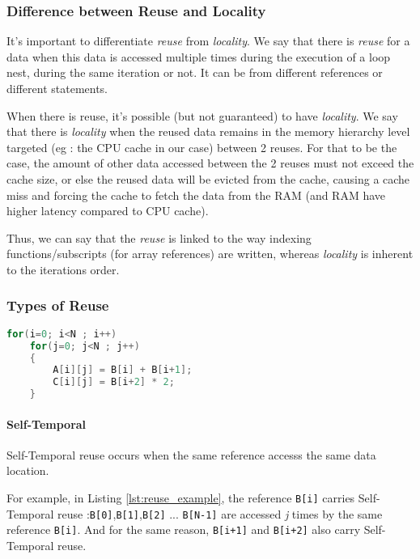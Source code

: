 \documentclass[paper=a4, fontsize=11.5pt]{scrartcl}
\numberwithin{equation}{section}        %
\numberwithin{figure}{section}          %
\numberwithin{table}{section}               %
\begin{document}
        \subsubsection{Difference between Reuse and Locality}
            It's important to differentiate \textit{reuse} from \textit{locality}.
            We say that there is \textit{reuse} for a data when this data is
            accessed multiple times during the execution of a loop nest, during
            the same iteration or not. It can be from different references or different statements.
            
            When there is reuse, it's possible (but not guaranteed) to have
            \textit{locality}. We say that there is \textit{locality} when the
            reused data remains in the memory hierarchy level targeted 
            (eg : the CPU cache in our case) between 2 reuses.
            For that to be the case, the amount of other data accessed between the
            2 reuses must not exceed the cache size, or else the reused data will be
            evicted from the cache, causing a cache miss and forcing the cache
            to fetch the data from the RAM (and RAM have higher latency compared to CPU cache).


            Thus, we can say that the \textit{reuse} is linked to the way indexing
            functions/subscripts (for array references) are written, whereas \textit{locality} is
            inherent to the iterations order.

\pagebreak
        \subsubsection{Types of Reuse}
            
\begin{lstlisting}[frame=single, language=C, caption=Reuse Example, label={lst:reuse_example}]
for(i=0; i<N ; i++)
    for(j=0; j<N ; j++)
    {
        A[i][j] = B[i] + B[i+1];
        C[i][j] = B[i+2] * 2;
    }
\end{lstlisting}

            \paragraph{Self-Temporal}
                Self-Temporal reuse occurs when the same reference accesss the same
                data location.
                
                For example, in Listing \ref{lst:reuse_example}, the reference \verb'B[i]' carries Self-Temporal
                reuse :\verb'B[0]',\verb'B[1]',\verb'B[2]' ... \verb'B[N-1]' are accessed
                \textit{j} times by the same reference \verb'B[i]'.
                And for the same reason, \verb'B[i+1]' and \verb'B[i+2]' also carry Self-Temporal reuse.
\end{document}
